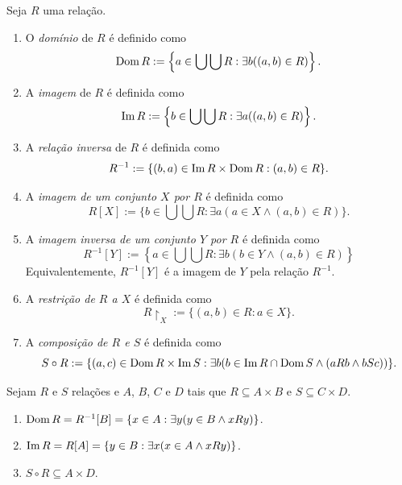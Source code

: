 \begin{definition}
    Seja $R$ uma relação.
        \begin{enumerate}[leftmargin=*, align=left, label=\textbf{(\alph*)}]
            \item O \emph{domínio} de $R$ é definido como
                \[
                    \operatorname{Dom} R := \left\{ a \in \bigcup \bigcup R : \exists b ((a,b) \in R) \right\}.
                \]
            \item A \emph{imagem} de $R$ é definida como
                \[
                    \operatorname{Im} R := \left\{ b \in \bigcup \bigcup R : \exists a ((a,b) \in R) \right\}.
                \]
            \item A \emph{relação inversa} de $R$ é definida como
                \[
                    R^{-1} := \{ (b,a) \in \operatorname{Im} R \times \operatorname{Dom} R : (a,b) \in R \}.
                \]
            \item A \emph{imagem de um conjunto $X$ por $R$} é definida como
                \[
                    R[X] := \{ b \in \bigcup \bigcup R : \exists a (a \in X \land (a,b) \in R) \}.
                \]
            \item A \emph{imagem inversa de um conjunto $Y$ por $R$} é definida como
                \[
                    R^{-1}[Y] := \left\{ a \in \bigcup \bigcup R : \exists b (b \in Y \land (a,b) \in R) \right\}
                \]
            Equivalentemente, $R^{-1}[Y]$ é a imagem de $Y$ pela relação $R^{-1}$. 
            \item A \emph{restrição de $R$ a $X$} é definida como
                \[
                    R \restriction_X := \{ (a,b) \in R : a \in X \}.
                \]
            \item A \emph{composição de $R$ e $S$} é definida como 
                \[
                    S \circ R := \{ (a,c) \in \operatorname{Dom} R \times \operatorname{Im} S : \exists b (b \in \operatorname{Im} R \cap \operatorname{Dom} S \land (aRb \land bSc)) \}.
                \]
        \end{enumerate}
\end{definition}

\begin{proposition} \label{prop.set:domeimdeRAB}
    Sejam $R$ e $S$ relações e $A$, $B$, $C$ e $D$ tais que $R \subseteq A \times B$ e $S \subseteq C \times D$.
        \begin{enumerate}[leftmargin=*, align=left, label=\textbf{(\alph*)}]
            \item $\operatorname{Dom} R = R^{-1}[B] = \{x \in A : \exists y (y \in B \land xRy)\}$.
            \item $\operatorname{Im} R = R[A] = \{ y \in B : \exists x (x \in A \land xRy)\}$.
            \item $S \circ R \subseteq A \times D$.
        \end{enumerate}
\end{proposition}


